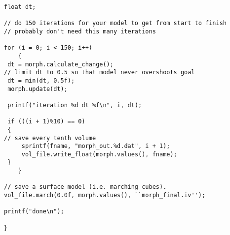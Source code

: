\begin{tt}
\begin{verbatim}
float dt;

// do 150 iterations for your model to get from start to finish
// probably don't need this many iterations

for (i = 0; i < 150; i++)
    {
 dt = morph.calculate_change();
// limit dt to 0.5 so that model never overshoots goal
 dt = min(dt, 0.5f);
 morph.update(dt);

 printf("iteration %d dt %f\n", i, dt);

 if (((i + 1)%10) == 0)
 {
// save every tenth volume
     sprintf(fname, "morph_out.%d.dat", i + 1);
     vol_file.write_float(morph.values(), fname);
 }
    }

// save a surface model (i.e. marching cubes).
vol_file.march(0.0f, morph.values(), ``morph_final.iv'');

printf("done\n");

}

\end{verbatim}
\end{tt}
\clearpage

